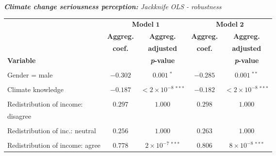 \documentclass[a4paper,12pt]{article}
\begin{document}
{\centering
\begin{threeparttable}
\singlespacing
\caption{\vspace{-0.35cm}\textit{\textbf{Climate change seriousness perception:} Jackknife OLS - robustness}}
\label{ClimCareInOut} 
\centering
\begin{small}
\vspace{-1.2cm}
\begin{tabular}{lcccc} 
\hline
  \multicolumn{1}{l}{}&\multicolumn{2}{c}{\textbf{Model} $\boldsymbol{1}$}&\multicolumn{2}{c}{\textbf{Model} $\boldsymbol{2}$}\\
\cmidrule(lr){2-3} \cmidrule(lr){4-5}
  \multicolumn{1}{l}{} & \multicolumn{1}{c}{\textbf{Aggreg.}}& \multicolumn{1}{c}{\textbf{Aggreg.}}& \multicolumn{1}{c}{\textbf{Aggreg.}} &  \multicolumn{1}{c}{\textbf{Aggreg.}} \\
    \multicolumn{1}{l}{} & \multicolumn{1}{c}{\textbf{coef.}}& \multicolumn{1}{c}{\textbf{adjusted}}& \multicolumn{1}{c}{\textbf{coef.}} &  \multicolumn{1}{c}{\textbf{adjusted}} \\
        \multicolumn{1}{l}{\textbf{Variable}}&\multicolumn{1}{c}{}& \multicolumn{1}{c}{\textbf{\textit{p}-value}}&\multicolumn{1}{c}{} &  \multicolumn{1}{c}{\textbf{\textit{p}-value}}\\
 \hline 
\vspace{-0.23cm}
\\
\vspace{-0.33cm}Gender = male&$-0.302$&$0.001~^{*}$&$-0.285$&$0.001~^{**}$\\
  \\
\vspace{-0.33cm}Climate knowledge\tnote{a}&$-0.187$&$<2\times10^{-8}~^{***}$&$-0.182$&$<2\times10^{-8}~^{***}$\\
  \\
 Redistribution of income:&\multirow{2}{*}{$0.297$}&\multirow{2}{*}{$1.000$}&  \multirow{2}{*}{$0.298$}&\multirow{2}{*}{$1.000$}  \\%
    \vspace{-0.33cm}   \hspace{0.6cm}disagree\tnote{b}&&&&\\%
    \\
  \vspace{-0.33cm}Redistribution of inc.: neutral\tnote{b}&$0.256$&$1.000$ &$0.263$&$1.000$\\%
    \\
  \vspace{-0.35cm}Redistribution of income: agree\tnote{b}&$0.778$&$2\times10^{-7}~^{***}$&$0.806$&$8\times10^{-8}~^{***}$\\%

\end{tabular}
\end{small}
\end{threeparttable}}
\end{document}
